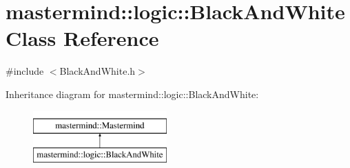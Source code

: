 \hypertarget{classmastermind_1_1logic_1_1_black_and_white}{}\section{mastermind\+:\+:logic\+:\+:Black\+And\+White Class Reference}
\label{classmastermind_1_1logic_1_1_black_and_white}


{\ttfamily \#include $<$Black\+And\+White.\+h$>$}

Inheritance diagram for mastermind\+:\+:logic\+:\+:Black\+And\+White\+:\begin{figure}[H]
\begin{center}
\leavevmode
\includegraphics[height=2.000000cm]{classmastermind_1_1logic_1_1_black_and_white}
\end{center}
\end{figure}
